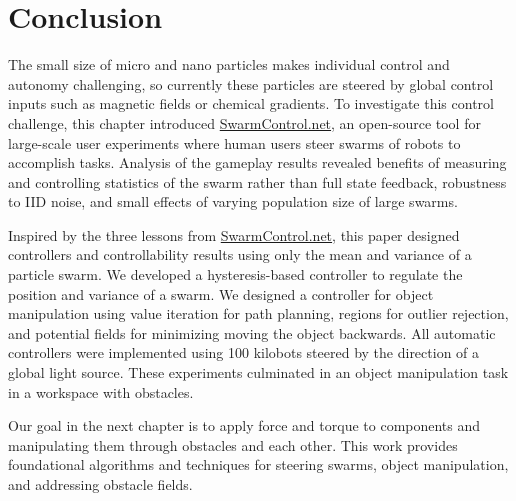\section{Conclusion}\label{sec:conclusion}
 
  The small size of micro and nano particles makes individual control and autonomy challenging, so currently these particles are steered by global control inputs such as magnetic fields or chemical gradients. To investigate this control challenge, this chapter introduced \href{http://www.swarmcontrol.net}{SwarmControl.net}, an open-source tool for large-scale user experiments where human users steer swarms of robots to accomplish tasks.  Analysis of the gameplay results revealed benefits of measuring and controlling statistics of the swarm rather than full state feedback, robustness to IID noise, and small effects of varying population size of large swarms.

Inspired by the three lessons from \href{www.swarmcontrol.net}{SwarmControl.net}, this paper designed controllers and controllability results using only the mean and variance of a particle swarm. 
We developed a hysteresis-based controller to regulate the position and variance of a swarm. We designed a controller for object manipulation using value iteration for path planning, regions for outlier rejection, and potential fields for minimizing moving the object backwards. 
All automatic controllers were implemented using 100 kilobots steered by the direction of a global light source.
These experiments culminated in an object manipulation task in a workspace with obstacles.
    


Our goal in the next chapter is to apply force and torque to components and manipulating them through obstacles and each other. This work provides foundational algorithms and techniques for steering swarms, object manipulation, and addressing obstacle fields.%


